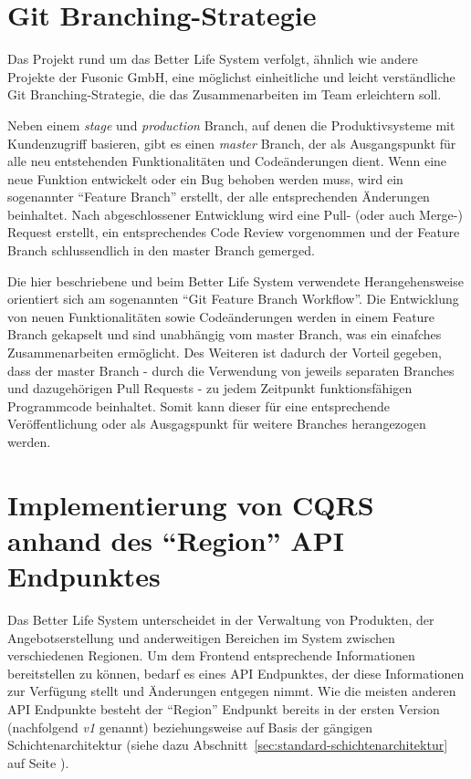 \documentclass[a4paper,12pt,twoside]{scrreprt}
\begin{document}
\section{Git Branching-Strategie}
\label{sec:git-branching-strategie}
Das Projekt rund um das Better Life System verfolgt, ähnlich wie andere Projekte der Fusonic GmbH, eine möglichst einheitliche und leicht verständliche Git Branching-Strategie, die das Zusammenarbeiten im Team erleichtern soll.

Neben einem \textit{stage} und \textit{production} Branch, auf denen die Produktivsysteme mit Kundenzugriff basieren, gibt es einen \textit{master} Branch, der als Ausgangspunkt für alle neu entstehenden Funktionalitäten und Codeänderungen dient. Wenn eine neue Funktion entwickelt oder ein Bug behoben werden muss, wird ein sogenannter \enquote{Feature Branch} erstellt, der alle entsprechenden Änderungen beinhaltet. Nach abgeschlossener Entwicklung wird eine Pull- (oder auch Merge-) Request erstellt, ein entsprechendes Code Review vorgenommen und der Feature Branch schlussendlich in den master Branch gemerged.

Die hier beschriebene und beim Better Life System verwendete Herangehensweise orientiert sich am sogenannten \enquote{Git Feature Branch Workflow}. Die Entwicklung von neuen Funktionalitäten sowie Codeänderungen werden in einem Feature Branch gekapselt und sind unabhängig vom master Branch, was ein einafches Zusammenarbeiten ermöglicht. Des Weiteren ist dadurch der Vorteil gegeben, dass der master Branch - durch die Verwendung von jeweils separaten Branches und dazugehörigen Pull Requests - zu jedem Zeitpunkt funktionsfähigen Programmcode beinhaltet. Somit kann dieser für eine entsprechende Veröffentlichung oder als Ausgagspunkt für weitere Branches herangezogen werden. \parencite[]{atlassian_git_2020}

\pagebreak

\section{Implementierung von CQRS anhand des \enquote{Region} API Endpunktes}
\label{sec:cqrs-implementierung-region}
Das Better Life System unterscheidet in der Verwaltung von Produkten, der Angebotserstellung und anderweitigen Bereichen im System zwischen verschiedenen Regionen. Um dem Frontend entsprechende Informationen bereitstellen zu können, bedarf es eines API Endpunktes, der diese Informationen zur Verfügung stellt und Änderungen entgegen nimmt. Wie die meisten anderen API Endpunkte besteht der \enquote{Region} Endpunkt bereits in der ersten Version (nachfolgend \textit{v1} genannt) beziehungsweise auf Basis der gängigen Schichtenarchitektur (siehe dazu Abschnitt~\ref{sec:standard-schichtenarchitektur} auf Seite \pageref{sec:standard-schichtenarchitektur}).
\end{document}
